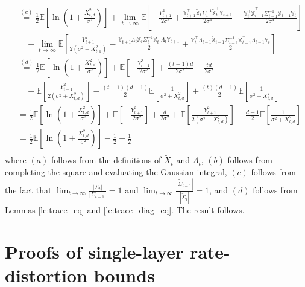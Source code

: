 \documentclass[twoside,11pt]{article}
\renewenvironment{proof}{\par\noindent{\bf Proof\ }}{\hfill\BlackBox\\[2mm]}
\newenvironment{proof}{\par\noindent{\bf Proof\ }}{\hfill\BlackBox\\[2mm]}
\def\E{\mathbb{E}}
\begin{document}
\begin{proof}
\begin{align*}
        & \overset{(c)}{=} \frac{1}{2}\E\left[\ln\left(1 + \frac{X_{t, d}^2}{\sigma^2}\right)\right] + \lim_{t\rightarrow\infty}\E\left[-\frac{Y^2_{t+1}}{2\sigma^2} + \frac{\mathbb{Y}_{t+1}^\top\tilde{\mathbb{X}}_{t}\Sigma^{-1}_t\tilde{\mathbb{X}}_{t}^\top\mathbb{Y}_{t+1}}{2\sigma^4} - \frac{\mathbb{Y}_{t}^\top\tilde{\mathbb{X}}_{t-1}^\top \Sigma^{-1}_{t-1} \tilde{\mathbb{X}}_{t-1}\mathbb{Y}_t}{2\sigma^4}\right]\\
        &\quad + \lim_{t\rightarrow\infty}\E\left[\frac{Y^2_{t+1}}{2(\sigma^2 + X^2_{t, d})} - \frac{\mathbb{Y}^\top_{t+1}\Lambda_{t}\tilde{\mathbb{X}}_{t}\Sigma^{-1}_t\mathbb{X}^\top_t\Lambda_{t}\mathbb{Y}_{t+1}}{2} + \frac{\mathbb{Y}^\top_{t}\Lambda_{t-1}\tilde{\mathbb{X}}_{t-1}\Sigma^{-1}_{t-1}\mathbb{X}^\top_{t-1}\Lambda_{t-1}\mathbb{Y}_{t}}{2}\right]\\
        & \overset{(d)}{=} \frac{1}{2}\E\left[\ln\left(1 + \frac{X_{t, d}^2}{\sigma^2}\right)\right] +\E\left[-\frac{Y^2_{t+1}}{2\sigma^2}\right] + \frac{(t+1)d}{2\sigma^2}-\frac{td}{2\sigma^2}\\
        &\quad + \E\left[\frac{Y^2_{t+1}}{2(\sigma^2 + X_{t,d}^2)}\right] -\frac{(t+1)(d-1)}{2}\E\left[\frac{1}{\sigma^2 + X_{t,d}^2}\right] + \frac{(t)(d-1)}{2}\E\left[\frac{1}{\sigma^2 + X_{t,d}^2}\right]\\
        & = \frac{1}{2}\E\left[\ln\left(1 + \frac{X_{t, d}^2}{\sigma^2}\right)\right] +\E\left[-\frac{Y^2_{t+1}}{2\sigma^2}\right] + \frac{d}{2\sigma^2} + \E\left[\frac{Y^2_{t+1}}{2(\sigma^2 + X_{t,d}^2)}\right] - \frac{d-1}{2}\E\left[\frac{1}{\sigma^2 + X^2_{t,d}}\right]\\
        & = \frac{1}{2}\E\left[\ln\left(1 + \frac{X_{t, d}^2}{\sigma^2}\right)\right] -\frac{1}{2} + \frac{1}{2}\\
    \end{align*}
    where $(a)$ follows from the definitions of $\tilde{X}_t$ and $\Lambda_{t}$, $(b)$ follows from completing the square and evaluating the Gaussian integral, $(c)$ follows from the fact that $\lim_{t\rightarrow\infty}\frac{|\Sigma_t|}{|\Sigma_{t-1}|} = 1$ and $\lim_{t\rightarrow\infty}\frac{|\tilde{\Sigma}_{t-1}|}{|\tilde{\Sigma}_{t}|} = 1$, and $(d)$ follows from Lemmas \ref{le:trace_eq} and \ref{le:trace_diag_eq}. The result follows.
\end{proof}

\section{Proofs of single-layer rate-distortion bounds}
\label{apdx:single_layer_rd}
\end{document}
